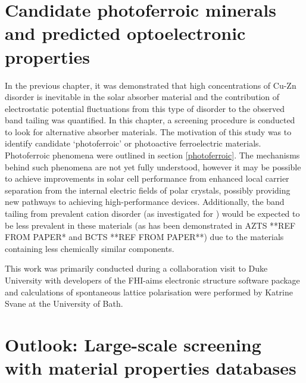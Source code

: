 \documentclass[11pt, twoside]{report}
\begin{document}
\section{Candidate photoferroic minerals and predicted optoelectronic properties}


In the previous chapter, it was demonstrated that high concentrations of Cu-Zn disorder is inevitable in the solar absorber material {\CZTS} and the contribution of electrostatic potential fluctuations from this type of disorder to the observed band tailing was quantified. In this chapter, a screening procedure is conducted to look for alternative absorber materials. The motivation of this study was to identify candidate `photoferroic’ or photoactive ferroelectric materials. Photoferroic phenomena were outlined in section \ref{photoferroic}. The mechanisms behind such phenomena are not yet fully understood, however it may be possible to achieve improvements in solar cell performance from enhanced local carrier separation from the internal electric fields of polar crystals, possibly providing new pathways to achieving high-performance devices.
Additionally, the band tailing from prevalent cation disorder (as investigated for {\CZTS}) would be expected to be less prevalent in these materials (as has been demonstrated in AZTS **REF FROM PAPER* and BCTS **REF FROM PAPER**) due to the materials containing less chemically similar components.

This work was primarily conducted during a collaboration visit to Duke University with developers of the FHI-aims \cite{FHI-aims} electronic structure software package and calculations of spontaneous lattice polarisation were performed by Katrine Svane at the University of Bath.






\section{Outlook: Large-scale screening with material properties databases}
\end{document}
